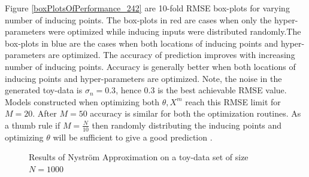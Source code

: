 Figure \ref{boxPlotsOfPerformance_242} are 10-fold RMSE box-plots for varying number of inducing points. The box-plots in red are cases when only the hyper-parameters were optimized while inducing inputs were distributed randomly.The box-plots in blue are the cases when both locations of inducing points and hyper-parameters are optimized. The accuracy of prediction improves with increasing number of inducing points. Accuracy is generally better when both locations of inducing points and hyper-parameters are optimized. Note, the noise in the generated toy-data is $\sigma_{n}=0.3$, hence $0.3$ is the best achievable RMSE value. Models constructed when optimizing both $\theta, X^{m}$ reach this RMSE limit for $M = 20$. After $M=50$ accuracy is similar for both the optimization routines. As a thumb rule if $M = \frac{N}{10}$ then randomly distributing the inducing points and optimizing $\theta$ will be sufficient to give a good prediction \cite{cao2013efficient}. 

\begin{figure}[!ht]
  \centering
    \quad
{}\quad
  
       \caption{Results of Nystr\"{o}m Approximation on a toy-data set of size $N=1000$ }\label{figGPPredictionNystorm}
\end{figure}

